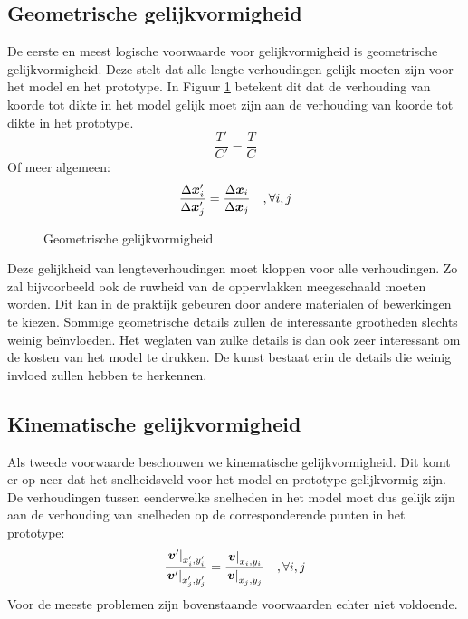 	\subsection{Geometrische gelijkvormigheid}
De eerste en meest logische voorwaarde voor gelijkvormigheid is geometrische gelijkvormigheid. Deze stelt dat alle lengte verhoudingen gelijk moeten zijn voor het model en het prototype. In Figuur \ref{fig:geometrische gelijvormigheid} betekent dit dat de verhouding van koorde tot dikte in het model gelijk moet zijn aan de verhouding van koorde tot dikte in het prototype.
\begin{equation}
	\dfrac{T'}{C'} = \dfrac{T}{C}
	\label{eqn:geometrische gelijkvormigheid vleugel}
\end{equation}
Of meer algemeen:
\begin{equation}
	\dfrac{\Delta \boldsymbol{x}_i'}{\Delta \boldsymbol{x}_j'} = \dfrac{\Delta \boldsymbol{x}_i}{\Delta \boldsymbol{x}_j} \quad, \forall i,j
	\label{eqn:geometrische gelijkvormigheid}
\end{equation}
\begin{figure}[htb]
	\centering
	
	\caption{Geometrische gelijkvormigheid}
	\label{fig:geometrische gelijvormigheid}
\end{figure}
Deze gelijkheid van lengteverhoudingen moet kloppen voor alle verhoudingen. Zo zal bijvoorbeeld ook de ruwheid van de oppervlakken meegeschaald moeten worden. Dit kan in de praktijk gebeuren door andere materialen of bewerkingen te kiezen. Sommige geometrische details zullen de interessante grootheden slechts weinig be\"invloeden. Het weglaten van zulke details is dan ook zeer interessant om de kosten van het model te drukken. De kunst bestaat erin de details die weinig invloed zullen hebben te herkennen.
	\subsection{Kinematische gelijkvormigheid}
Als tweede voorwaarde beschouwen we kinematische gelijkvormigheid. Dit komt er op neer dat het snelheidsveld voor het model en prototype gelijkvormig zijn. De verhoudingen tussen eenderwelke snelheden in het model moet dus gelijk zijn aan de verhouding van snelheden op de corresponderende punten in het prototype:
\begin{equation}
	\dfrac{\left. \boldsymbol{v}' \right|_{x_i',y_i'}}{\left. \boldsymbol{v}' \right|_{x_j',y_j'}} = \dfrac{\left. \boldsymbol{v} \right|_{x_i,y_i}}{\left. \boldsymbol{v} \right|_{x_j,y_j}} \quad, \forall i,j
	\label{eqn:kinematische gelijkvormigheid}
\end{equation}
Voor de meeste problemen zijn bovenstaande voorwaarden echter niet voldoende.
